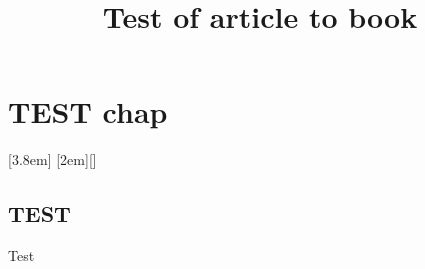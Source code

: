 \documentclass{article}
\title{Test of article to book}
\begin{document}
    \maketitle
    \tableofcontents
    
    
    
    \chapter{TEST chap}
    [3.8em]{}{\contentslabel{2.3em}}{\hspace*{-2.3em}}{\contentspage}
    [2em]{}{\bfseries\contentslabel{2em}}{}{\hfill\contentspage}[]
    \section{TEST}
    Test
\end{document}
